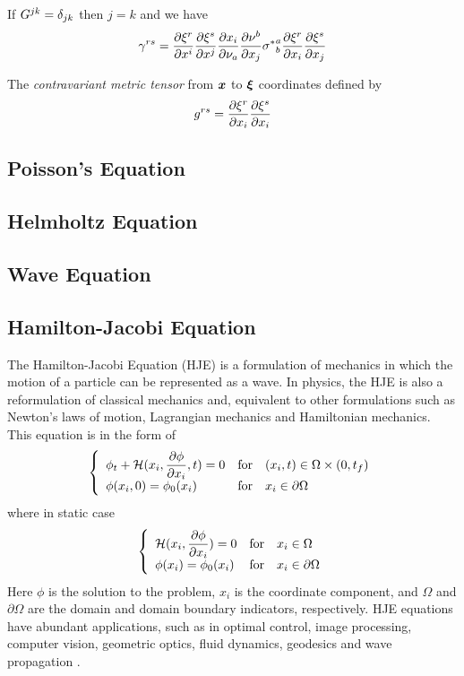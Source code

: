 If $G^{jk}=\delta_{{j}{k}}$ then $j=k$ and we have
\begin{equation}
  \gamma^{rs}= \dfrac{\partial \xi^{r}}{\partial x^{i}}  \dfrac{\partial \xi^{s}}{\partial x^{j}}  \dfrac{\partial x_{i}}{\partial \nu_{a}}  \dfrac{\partial \nu^{b}}{\partial x_{j}} {\sigma^{*}}^{a}_{b} \dfrac{\partial \xi^{r}}{\partial x_{i}}  \dfrac{\partial \xi^{s}}{\partial x_{j}} 
\end{equation}



The \emph{contravariant metric tensor} from $\vect{x}$ to $\vect{\xi}$ coordinates defined by
\begin{equation}
  g^{rs}= \dfrac{\partial \xi^{r}}{\partial x_{i}}  \dfrac{\partial \xi^{s}}{\partial x_{i}} 
  \label{eqn:contrametrictensor}
\end{equation}


\subsection{Poisson's Equation}

\subsection{Helmholtz Equation}

\subsection{Wave Equation}

\subsection{Hamilton-Jacobi Equation}
\noindent The Hamilton-Jacobi Equation (HJE) is a formulation of mechanics in which the motion of a particle can be represented as a wave. In physics, the HJE is also a reformulation of classical mechanics and, equivalent to other formulations such as Newton's laws of motion, Lagrangian mechanics and Hamiltonian mechanics. This equation is in the form of
\begin{eqnarray}
\left\{ \begin{array}{lcl} \phi_t + \mathcal{H}(x_i, \dfrac{\partial \phi}{\partial x_{i}} ,t) = 0 & \mbox{for} & (x_{i},t)\in\Omega\times(0,t_f) \\ \phi(x_i,0) = \phi_0(x_i)  & \mbox{for} & x_i\in\partial\Omega \end{array}\right.
\end{eqnarray}
where in static case 
\begin{eqnarray}
\left\{ \begin{array}{lcl} \mathcal{H}(x_i, \dfrac{\partial \phi}{\partial x_{i}} ) = 0 & \mbox{for} & x_i\in\Omega \\ \phi(x_i) = \phi_0(x_i)  & \mbox{for} & x_i\in\partial\Omega \end{array}\right. 
\end{eqnarray}
Here $\phi$ is the solution to the problem, $x_i$ is the coordinate component, and $\Omega$ and $\partial\Omega$ are the domain and domain boundary indicators, respectively.
HJE equations have abundant applications, such as in optimal control, image processing, computer vision, geometric optics, fluid dynamics, geodesics and wave propagation \cite{sethian:1999}.

